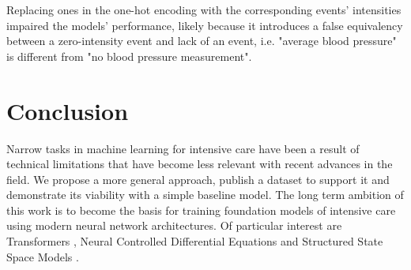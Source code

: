 Replacing ones in the one-hot encoding with the corresponding events' intensities impaired the models' performance, likely because it introduces a false equivalency between a zero-intensity event and lack of an event, i.e. "average blood pressure" is different from "no blood pressure measurement".





\section{Conclusion}

Narrow tasks in machine learning for intensive care have been a result of technical limitations that have become less relevant with recent advances in the field. 
We propose a more general approach, publish a dataset to support it and demonstrate its viability with a simple baseline model.
The long term ambition of this work is to become the basis for training foundation models of intensive care using modern neural network architectures.
Of particular interest are Transformers \cite{vaswaniAttentionAllYou2023}, Neural Controlled Differential Equations \cite{kidgerNeuralControlledDifferential2020} and Structured State Space Models \cite{guEfficientlyModelingLong2022}.